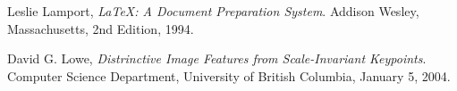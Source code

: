 \begin{thebibliography}{99}

  Leslie Lamport,
  \emph{\LaTeX: A Document Preparation System}.
  Addison Wesley, Massachusetts,
  2nd Edition,
  1994.
  
  David G. Lowe,
  \emph{Distrinctive Image Features from Scale-Invariant Keypoints}.
  Computer Science Department, University of British Columbia,
  January 5, 2004.

\end{thebibliography}